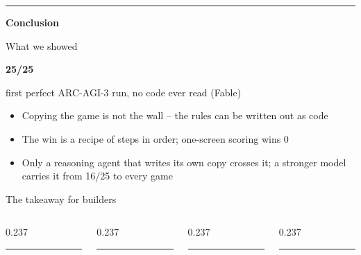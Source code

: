 \documentclass[aspectratio=169,11pt]{beamer}
\begin{document}
\begin{frame}[plain]\centering\vfill
{\color{owochre}\rule{40pt}{2.5pt}}\par\vskip10pt
{\color{owdeep}\bfseries\Large Conclusion\par}\vfill\end{frame}
\begin{frame}{What we showed}\vfill\begin{center}{\color{owteal}\fontsize{58}{62}\selectfont\bfseries 25/25}\par\vskip10pt{\color{owdeep}\large first perfect ARC-AGI-3 run, no code ever read (Fable)}\end{center}\vskip10pt\begin{itemize}\item Copying the game is not the wall -- the rules can be written out as code\item The win is a recipe of steps in order; one-screen scoring wins 0\item Only a reasoning agent that writes its own copy crosses it; a stronger model carries it from 16/25 to every game\end{itemize}\vfill\end{frame}
\begin{frame}{The takeaway for builders}\vfill\begin{columns}[T]\begin{column}{0.237\textwidth}{\color{owteal}\rule{20pt}{3pt}}\par{}\par{}\end{column}\begin{column}{0.237\textwidth}{\color{owochre}\rule{20pt}{3pt}}\par{}\par{}\end{column}\begin{column}{0.237\textwidth}{\color{owblue}\rule{20pt}{3pt}}\par{}\par{}\end{column}\begin{column}{0.237\textwidth}{\color{owmuted}\rule{20pt}{3pt}}\par{}\par{}\end{column}\end{columns}\vfill\end{frame}
\end{document}

